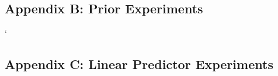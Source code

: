 \documentclass[12pt]{article}
\begin{document}
%
\subsection{Appendix B: Prior Experiments}\label{priorAppendix}

`%
\subsection{Appendix C: Linear Predictor Experiments}\label{lpAppendix}

%
%
%
%
%
%
%
%
%
\end{document}
